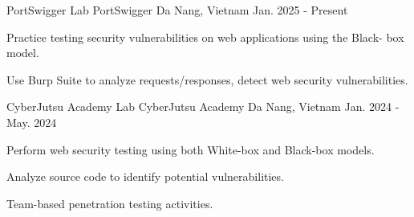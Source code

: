 

\begin{cventries}

  \cventry
    {PortSwigger Lab} %
    {PortSwigger} %
    {Da Nang, Vietnam} %
    {Jan. 2025 - Present} %
    {
      \begin{cvitems} %
        \item {Practice testing security vulnerabilities on web applications using the Black-
box model.}
        \item {Use Burp Suite to analyze requests/responses, detect web security
vulnerabilities.}
      \end{cvitems}
    }

  \cventry
    {CyberJutsu Academy Lab} %
    {CyberJutsu Academy} %
    {Da Nang, Vietnam} %
    {Jan. 2024 - May. 2024} %
    {
      \begin{cvitems} %
        \item {Perform web security testing using both White-box and Black-box models.}
        \item {Analyze source code to identify potential vulnerabilities.}
        \item {Team-based penetration testing activities.}
      \end{cvitems}
    }

\end{cventries}
